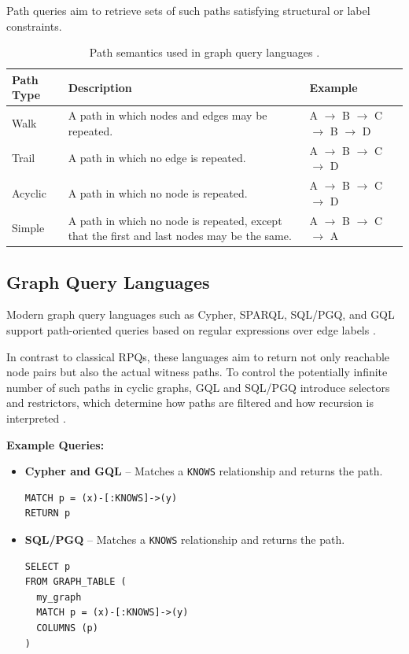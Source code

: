 Path queries aim to retrieve sets of such paths satisfying structural or label constraints.


\begin{table}[ht]
    \centering
    \begin{tabular}{|l|p{7.5cm}|p{3.2cm}|}
        \hline
        \textbf{Path Type} & \textbf{Description} & \textbf{Example} \\
        \hline
        Walk &
        A path in which nodes and edges may be repeated.
        &
        A $\rightarrow$ B $\rightarrow$ C $\rightarrow$ B $\rightarrow$ D
        \\
        \hline
        Trail &
        A path in which no edge is repeated.
        &
        A $\rightarrow$ B $\rightarrow$ C $\rightarrow$ D
        \\
        \hline
        Acyclic &
        A path in which no node is repeated.
        &
        A $\rightarrow$ B $\rightarrow$ C $\rightarrow$ D
        \\
        \hline
        Simple &
        A path in which no node is repeated, except that the first and last nodes may be the same.
        &
        A $\rightarrow$ B $\rightarrow$ C $\rightarrow$ A
        \\
        \hline
    \end{tabular}
    \caption{Path semantics used in graph query languages \cite{angles2024path}.}
\end{table}


\subsection{Graph Query Languages}

Modern graph query languages such as Cypher, SPARQL, SQL/PGQ, and GQL support path-oriented queries based on regular expressions over edge labels \cite{angles2017foundations,angles2024path}.

In contrast to classical RPQs, these languages aim to return not only reachable node pairs but also the actual witness paths. To control the potentially infinite number of such paths in cyclic graphs, GQL and SQL/PGQ introduce selectors and restrictors, which determine how paths are filtered and how recursion is interpreted \cite{angles2024path}.


\textbf{Example Queries:}

\begin{itemize}

    \item \textbf{Cypher and GQL} -- Matches a \texttt{KNOWS} relationship and returns the path.
\begin{verbatim}
MATCH p = (x)-[:KNOWS]->(y)
RETURN p
\end{verbatim}

    \item \textbf{SQL/PGQ} -- Matches a \texttt{KNOWS} relationship and returns the path.
\begin{verbatim}
SELECT p
FROM GRAPH_TABLE (
  my_graph
  MATCH p = (x)-[:KNOWS]->(y)
  COLUMNS (p)
)
\end{verbatim}

\end{itemize}
